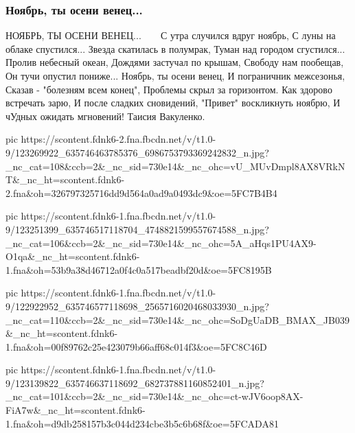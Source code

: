  
 
 

\subsubsection{Ноябрь, ты осени венец...}
\label{sec:poetry.rus.taisia_vakulenko.nojabr}

НОЯБРЬ, ТЫ ОСЕНИ ВЕНЕЦ...🍁🌿🍂🍁🌿🍂
С утра случился вдруг ноябрь,
С луны на облаке спустился...
Звезда скатилась в полумрак,
Туман над городом сгустился...
Пролив небесный океан,
Дождями застучал по крышам,
Свободу нам пообещав,
Он тучи опустил пониже...
Ноябрь, ты осени венец,
И пограничник межсезонья,
Сказав - "болезням всем конец",
Проблемы скрыл за горизонтом. 
Как здорово встречать зарю,
И после сладких сновидений,
"Привет" воскликнуть ноябрю,
И чУдных ожидать мгновений!
Таисия Вакуленко. 

\ifcmt
pic https://scontent.fdnk6-2.fna.fbcdn.net/v/t1.0-9/123269922_635746463785376_6986753793369242832_n.jpg?_nc_cat=108&ccb=2&_nc_sid=730e14&_nc_ohc=vU_MUvDmpl8AX8VRkNT&_nc_ht=scontent.fdnk6-2.fna&oh=326797325716dd9d564a0ad9a0493dc9&oe=5FC7B4B4

pic https://scontent.fdnk6-1.fna.fbcdn.net/v/t1.0-9/123251399_635746517118704_4748821599557674588_n.jpg?_nc_cat=106&ccb=2&_nc_sid=730e14&_nc_ohc=5A_aHqs1PU4AX9-O1qa&_nc_ht=scontent.fdnk6-1.fna&oh=53b9a38d46712a0f4c0a517beadbf20d&oe=5FC8195B

pic https://scontent.fdnk6-1.fna.fbcdn.net/v/t1.0-9/122922952_635746577118698_2565716020468033930_n.jpg?_nc_cat=110&ccb=2&_nc_sid=730e14&_nc_ohc=SoDgUaDB_BMAX_JB039&_nc_ht=scontent.fdnk6-1.fna&oh=00f89762c25e423079b66aff68c014f3&oe=5FC8C46D

pic https://scontent.fdnk6-1.fna.fbcdn.net/v/t1.0-9/123139822_635746637118692_682737881160852401_n.jpg?_nc_cat=101&ccb=2&_nc_sid=730e14&_nc_ohc=ct-wJV6oop8AX-FiA7w&_nc_ht=scontent.fdnk6-1.fna&oh=d9db258157b3c044d234cbe3b5c6b68f&oe=5FCADA81
\fi
